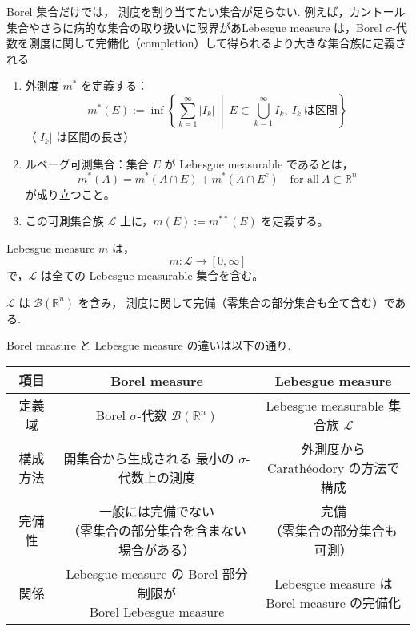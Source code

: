 Borel 集合だけでは， 測度を割り当てたい集合が足らない. 例えば，カントール集合やさらに病的な集合の取り扱いに限界があLebesgue measure は，Borel \(\sigma\)-代数を測度に関して完備化（completion）して得られるより大きな集合族に定義される.

\begin{enumerate}
    \item 外測度 \(m^*\) を定義する：
    \[
    m^*(E) := \inf \left\{ \sum_{k=1}^\infty |I_k| \ \middle| \ E \subset \bigcup_{k=1}^\infty I_k, \ I_k \ \text{は区間} \right\}
    \]
    （\(|I_k|\) は区間の長さ）
    \item ルベーグ可測集合：集合 \(E\) が Lebesgue measurable であるとは，
    \[
    m^*(A) = m^*(A \cap E) + m^*(A \cap E^c) \quad \text{for all} \ A \subset \mathbb{R}^n
    \]
    が成り立つこと。
    \item この可測集合族 \(\mathcal{L}\) 上に，\(m(E) := m^{**}(E)\) を定義する。
\end{enumerate}
\begin{tcolorbox}[mybox]
\begin{defn}
Lebesgue measure \(m\) は，
\[
m : \mathcal{L} \to [0, \infty]
\]
で，\(\mathcal{L}\) は全ての Lebesgue measurable 集合を含む。
\end{defn}
\end{tcolorbox}
\(\mathcal{L}\) は \(\mathcal{B}(\mathbb{R}^n)\) を含み， 測度に関して完備（零集合の部分集合も全て含む）である.

Borel measure と Lebesgue measure の違いは以下の通り. 

\begin{center}
\renewcommand{\arraystretch}{1.3} %
\begin{tabular}{|c|c|c|}
\hline
項目 & Borel measure & Lebesgue measure \\ \hline
定義域 &
\shortstack[c]{Borel $\sigma$-代数\\$\mathcal{B}(\mathbb{R}^n)$} &
\shortstack[c]{Lebesgue measurable\\集合族 $\mathcal{L}$} \\ \hline
構成方法 &
\shortstack[c]{開集合から生成される\\最小の $\sigma$-代数上の測度} &
\shortstack[c]{外測度から\\Carathéodory の方法で構成} \\ \hline
完備性 &
\shortstack[c]{一般には完備でない\\（零集合の部分集合を含まない場合がある）} &
\shortstack[c]{完備\\（零集合の部分集合も可測）} \\ \hline
関係 &
\shortstack[c]{Lebesgue measure の Borel 部分制限が\\Borel Lebesgue measure} &
\shortstack[c]{Lebesgue measure は\\Borel measure の完備化} \\ \hline
\end{tabular}
\end{center}



